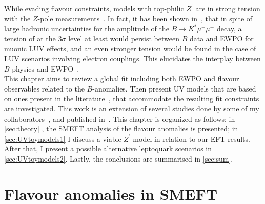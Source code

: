 While evading flavour constraints, models with top-philic $Z^\prime$ are in strong tension with the $Z$-pole measurements~\cite{Camargo-Molina:2018cwu,Efrati:2015eaa}. In fact, it has been shown in~\cite{Ciuchini:2019usw}, that in spite of  large hadronic uncertainties for the  amplitude of the $B \to K^{*} \mu^{+} \mu^{-}$ decay, a tension of at the 3$\sigma$ level at least would persist between $B$ data and EWPO for muonic LUV effects, and an even stronger tension would be found in the case of LUV scenarios involving electron couplings. This elucidates the interplay between $B$-physics and EWPO~\cite{Bhattacharya:2014wla,Feruglio:2016gvd,Celis:2017doq,Buttazzo:2017ixm,Kumar:2018kmr,Ciuchini:2019usw,Aebischer:2019mlg,Cornella:2019hct}. \\
This chapter aims to review a global fit including both EWPO and flavour observables related to the $B$-anomalies. Then present UV models that are based on ones present in the literature~\cite{Kamenik:2017tnu,Fox:2018ldq,Celis:2017doq},  that accommodate the resulting fit constraints are investigated. This work is an extension of several studies done by some of my collaborators~\cite{Ciuchini:2015qxb,Ciuchini:2016weo,Ciuchini:2017mik,Ciuchini:2017gva,Ciuchini:2018xll,Ciuchini:2018anp,Ciuchini:2019usw}, and published in~\cite{Alasfar:2020mne}. 
This chapter is organized as follows: in \autoref{sec:theory} , the SMEFT analysis of the flavour anomalies is presented; in \autoref{sec:UVtoymodels1} I discuss a viable $Z^{\prime}$ model in relation to our EFT results. After that, I present a possible alternative leptoquark scenarios in~ \autoref{sec:UVtoymodels2}. Lastly, the conclusions are summarised in \autoref{sec:sum}.
\section{Flavour anomalies in SMEFT }
\label{sec:theory}
